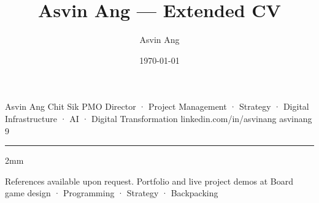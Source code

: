 \documentclass[10pt]{class/Template_CV}
\title{Asvin Ang — Extended CV}
\date{\today}
\author{Asvin Ang}
\begin{document}

  {Asvin Ang Chit Sik}
  {PMO Director · Project Management · Strategy · Digital Infrastructure · AI · Digital Transformation}
  {}
  { }
  {linkedin.com/in/asvinang}
  {asvinang}
  {9}
\par\vspace{2mm}

{}

\medskip
{}

\medskip
{}
\hfill
{}
{}

\newpage

\vspace*{1mm}
{\color{Primary2}\hrule}
\vspace*{2mm}
\begin{addmargin}[2mm]{2mm}

\end{addmargin}

\newpage

{}

\newpage

{}

\medskip
{}
{}

\medskip
{\footnotesize\textcolor{Grey1}{\centering
  References available upon request.
  Portfolio and live project demos at \href{https://asvinang.github.io}{}
  \textbar{} Board game design · Programming · Strategy · Backpacking
}}

\end{document}
